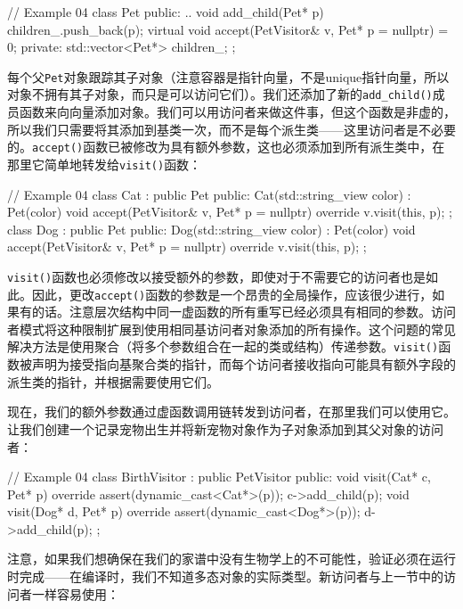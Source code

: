 \begin{code}
// Example 04
class Pet {
  public:
  ..
  void add_child(Pet* p) { children_.push_back(p); }
  virtual void accept(PetVisitor& v, Pet* p = nullptr) = 0;
  private:
  std::vector<Pet*> children_;
};
\end{code}

每个父\texttt{Pet}对象跟踪其子对象（注意容器是指针向量，不是unique指针向量，所以对象不拥有其子对象，而只是可以访问它们）。我们还添加了新的\texttt{add\_child()}成员函数来向向量添加对象。我们可以用访问者来做这件事，但这个函数是非虚的，所以我们只需要将其添加到基类一次，而不是每个派生类——这里访问者是不必要的。\texttt{accept()}函数已被修改为具有额外参数，这也必须添加到所有派生类中，在那里它简单地转发给\texttt{visit()}函数：

\begin{code}
// Example 04
class Cat : public Pet {
  public:
  Cat(std::string_view color) : Pet(color) {}
  void accept(PetVisitor& v, Pet* p = nullptr) override {
    v.visit(this, p);
  }
};
class Dog : public Pet {
  public:
  Dog(std::string_view color) : Pet(color) {}
  void accept(PetVisitor& v, Pet* p = nullptr) override {
    v.visit(this, p);
  }
};
\end{code}

\texttt{visit()}函数也必须修改以接受额外的参数，即使对于不需要它的访问者也是如此。因此，更改\texttt{accept()}函数的参数是一个昂贵的全局操作，应该很少进行，如果有的话。注意层次结构中同一虚函数的所有重写已经必须具有相同的参数。访问者模式将这种限制扩展到使用相同基访问者对象添加的所有操作。这个问题的常见解决方法是使用聚合（将多个参数组合在一起的类或结构）传递参数。\texttt{visit()}函数被声明为接受指向基聚合类的指针，而每个访问者接收指向可能具有额外字段的派生类的指针，并根据需要使用它们。

现在，我们的额外参数通过虚函数调用链转发到访问者，在那里我们可以使用它。让我们创建一个记录宠物出生并将新宠物对象作为子对象添加到其父对象的访问者：

\begin{code}
// Example 04
class BirthVisitor : public PetVisitor {
  public:
  void visit(Cat* c, Pet* p) override {
    assert(dynamic_cast<Cat*>(p));
    c->add_child(p);
  }
  void visit(Dog* d, Pet* p) override {
    assert(dynamic_cast<Dog*>(p));
    d->add_child(p);
  }
};
\end{code}

注意，如果我们想确保在我们的家谱中没有生物学上的不可能性，验证必须在运行时完成——在编译时，我们不知道多态对象的实际类型。新访问者与上一节中的访问者一样容易使用：

